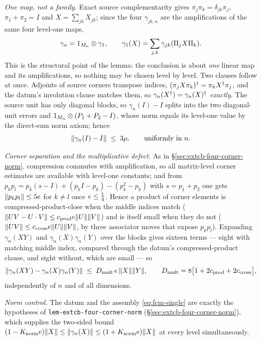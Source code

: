 \emph{One map, not a family.} Exact source complementarity gives
$\pi_j\pi_k=\delta_{jk}\pi_j$, $\pi_1+\pi_2=I$ and $X=\sum_{jk}X_{jk}$; since the four
$\gamma_{jk,n}$ are the amplifications of the same four level-one maps,
\begin{equation}\label{eq:fcm-single}
  \gamma_n=1_{M_{n}}\otimes\gamma_1,\qquad
  \gamma_1(X)=\sum_{j,k}\gamma_{jk}(\Pi_jX\Pi_k).
\end{equation}
This is the structural point of the lemma: the conclusion is about \emph{one} linear map
and its amplifications, so nothing may be chosen level by level. Two clauses follow at
once. Adjoints of source corners transpose indices, $(\pi_jX\pi_k)^{\dagger}=\pi_kX^{\dagger}\pi_j$, and
the datum's involution clause matches them, so $\gamma_n(X^{\dagger})=\gamma_n(X)^{\dagger}$
\emph{exactly}. The source unit has only diagonal blocks, so
$\gamma_n(I)-I$ splits into the two diagonal-unit errors and
$1_{M_{n}}\otimes(P_1+P_2-I)$, whose norm equals its level-one value by the direct-sum norm
axiom; hence
\begin{equation}\label{eq:fcm-unit}
  \lVert \gamma_n(I)-I\rVert\;\le\;3\rho ,\qquad\text{uniformly in }n .
\end{equation}

\emph{Corner separation and the multiplicative defect.} As in
\S\ref{sec:extcb-four-corner-norm}, compression commutes with amplification, so all
matrix-level corner estimates are available with level-one constants; and from
$p_kp_l=p_k(s-I)+(p_kI-p_k)-(p_k^{2}-p_k)$ with $s=p_1+p_2$ one gets
$\lVert p_kp_l\rVert\le5e$ for $k\ne l$ once $e\le\tfrac14$. Hence a product of corner
elements is compressed-product-close when the middle indices match
($\lVert UV-U\mathbin{\cdot} V\rVert\le c_{\mathrm{prod}}e\lVert U\rVert\lVert V\rVert$) and is itself small when they
do not ($\lVert UV\rVert\le c_{\mathrm{cross}}e\lVert U\rVert\lVert V\rVert$, by three associator moves
that expose $p_kp_l$). Expanding $\gamma_n(XY)$ and $\gamma_n(X)\gamma_n(Y)$ over the
blocks gives sixteen terms --- eight with matching middle index, compared through the
datum's compressed-product clause, and eight without, which are small --- so
\begin{equation}\label{eq:fcm-mult}
  \lVert \gamma_n(XY)-\gamma_n(X)\gamma_n(Y)\rVert\;\le\;D_{\mathrm{mult}}\,e\,\lVert X\rVert\lVert Y\rVert,
  \qquad D_{\mathrm{mult}}=8\bigl[1+2c_{\mathrm{prod}}+2c_{\mathrm{cross}}\bigr],
\end{equation}
independently of $n$ and of all dimensions.

\emph{Norm control.} The datum and the assembly \eqref{eq:fcm-single} are exactly the
hypotheses of \texttt{lem-extcb-four-corner-norm}
(\S\ref{sec:extcb-four-corner-norm}), which supplies the two-sided bound
$(1-K_{\mathrm{norm}}e)\lVert X\rVert\le\lVert \gamma_n(X)\rVert\le(1+K_{\mathrm{norm}}e)\lVert X\rVert$
at every level simultaneously.

